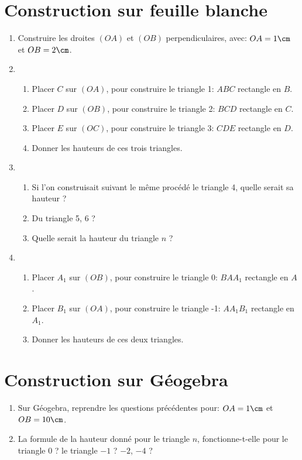 \def\theme{Activités géométriques : Hauteurs et Triangles}
\def\date{04/11/2023}

\newcommand*{\tri}[4]{
    \item Placer $#4$ sur $(O#2)$, pour construire le triangle #1: $#2#3#4$ rectangle en $#3$.
}

\section{Construction sur feuille blanche}

\begin{enumerate}\setlength{\itemsep}{15pt}%
    \item Construire les droites $(OA)$ et $(OB)$ perpendiculaires,
    avec: $OA = 1\cm$ et $OB = 2\cm$.
    \item \begin{enumerate}
        \tri{1}{A}{B}{C}
        \tri{2}{B}{C}{D}
        \tri{3}{C}{D}{E}
        \item Donner les hauteurs de ces trois triangles.
    \end{enumerate}
    \item \begin{enumerate}
        \item Si l'on construisait suivant le même procédé le triangle 4,
        quelle serait sa hauteur ? 
        \item Du triangle 5, 6 ?
        \item Quelle serait la hauteur du triangle $n$ ?
    \end{enumerate}
    \item \begin{enumerate} 
        \tri{0}{B}{A}{A_1}
        \tri{-1}{A}{A_1}{B_1}
        \item Donner les hauteurs de ces deux triangles.
    \end{enumerate}
\end{enumerate}

\section{Construction sur Géogebra}

\begin{enumerate}
    \item Sur Géogebra, reprendre les questions précédentes pour:
    $OA = 1\cm$ et $OB = 10\cm$.\\
    
    \vspace*{0.5cm}
    \item La formule de la hauteur donné pour le triangle $n$, fonctionne-t-elle pour le triangle $0$ ? le triangle $-1$ ? $-2$, $-4$ ?
\end{enumerate}
